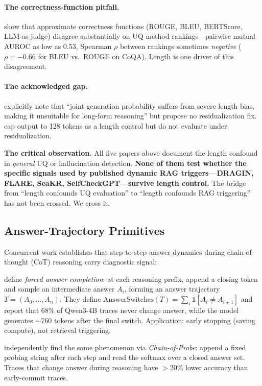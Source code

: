 \documentclass[11pt]{article}
\begin{document}
\paragraph{The correctness-function pitfall.}
\cite{Ielanskyi_PitfallsUQEvaluationNLG} show that approximate
correctness functions (ROUGE, BLEU, BERTScore, LLM-as-judge)
disagree substantially on UQ method rankings---pairwise mutual AUROC
as low as 0.53, Spearman $\rho$ between rankings sometimes
\emph{negative} ($\rho = -0.66$ for BLEU vs.\ ROUGE on CoQA).
Length is one driver of this disagreement.

\paragraph{The acknowledged gap.}
\cite{Mao_ConfidenceOverTimeSTL} explicitly note that ``joint
generation probability suffers from severe length bias, making it
unsuitable for long-form reasoning'' but propose no residualization
fix. \cite{Chen_DynamicInstabilityLLMReasoning} cap output to 128
tokens as a length control but do not evaluate under
residualization.

\medskip
\noindent\textbf{The critical observation.} All five papers above
document the length confound in \emph{general} UQ or hallucination
detection. \textbf{None of them test whether the specific signals
used by published dynamic RAG triggers---DRAGIN, FLARE, SeaKR,
SelfCheckGPT---survive length control.}
The bridge from ``length confounds UQ evaluation'' to ``length
confounds RAG triggering'' has not been crossed.
We cross it.


\subsection{Answer-Trajectory Primitives}

Concurrent work establishes that step-to-step answer dynamics during
chain-of-thought (CoT) reasoning carry diagnostic signal:

\cite{Datta_DecideEarlyExplainLater} define \emph{forced answer
completion}: at each reasoning prefix, append a closing token and
sample an intermediate answer $A_i$, forming an answer trajectory
$T = (A_0, \ldots, A_n)$. They define
$\text{AnswerSwitches}(T) = \sum_i \mathbb{1}[A_i \ne A_{i+1}]$
and report that 68\% of Qwen3-4B traces never change answer, while
the model generates $\sim$760 tokens after the final switch.
Application: early stopping (saving compute), not retrieval
triggering.

\cite{Wang_ChainOfProbeCoTStepByStep} independently find the same
phenomenon via \emph{Chain-of-Probe}: append a fixed probing string
after each step and read the softmax over a closed answer set. Traces
that change answer during reasoning have $>$20\% lower accuracy than
early-commit traces.
\end{document}
